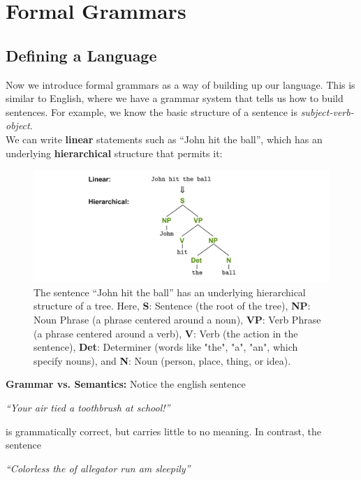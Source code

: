\section{Formal Grammars}
\subsection{Defining a Language}
Now we introduce formal grammars as a way of building up our language.
This is similar to English, where we have a grammar system that tells us how to build sentences.
For example, we know the basic structure of a sentence is \textit{subject-verb-object}. \\

\noindent
We can write \textbf{linear} statements such as ``John hit the ball'', which has an underlying \textbf{hierarchical} structure that permits it:

\begin{figure}[h]
\centering
\includegraphics[width=1\textwidth]{Sections/Formal/eng.png}
\caption{The sentence ``John hit the ball'' has an underlying hierarchical structure of a tree. Here, \textbf{S}: Sentence (the root of the tree), \textbf{NP}: Noun Phrase (a phrase centered around a noun), \textbf{VP}: Verb Phrase (a phrase centered around a verb), \textbf{V}: Verb (the action in the sentence), \textbf{Det}: Determiner (words like "the", "a", "an", which specify nouns), and \textbf{N}: Noun (person, place, thing, or idea).}
\end{figure}

\noindent
\textbf{Grammar vs. Semantics:} Notice the english sentence 

\begin{center}
\Large \textit{``Your air tied a toothbrush at school!''}
\end{center}

\noindent
is grammatically correct, but carries little to no meaning. In contrast, 
the sentence

\begin{center}
\Large \textit{``Colorless the of allegator run am sleepily''}
\end{center}

